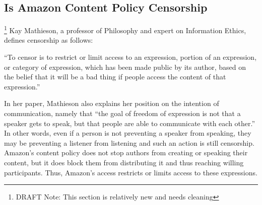 \documentclass[11pt]{article}
\begin{document}
\begin{multicols}{2}






\subsection{Is Amazon Content Policy Censorship} \footnote{DRAFT Note: This section is relatively new and needs cleaning}
Kay Mathieson, a professor of Philosophy and expert on Information Ethics, defines censorship as follows:

``To censor is to restrict or limit access to an expression, portion of an expression, or category of expression, which has been made public by its author, based on the belief that it will be a bad thing if people access the content of that expression.'' \cite{MathiesenCensorship}

In her paper, Mathieson also explains her position on the intention of communication, namely that ``the goal of freedom of expression is not that a speaker gets to speak, but that people are able to communicate with each other.''  In other words, even if a person is not preventing a speaker from speaking, they may be preventing a listener from listening and such an action is still censorship.  Amazon's content policy does not stop authors from creating or speaking their content, but it does block them from distributing it and thus reaching willing participants.  Thus, Amazon's access restricts or limits access to these expressions.


\end{multicols}
\end{document}
